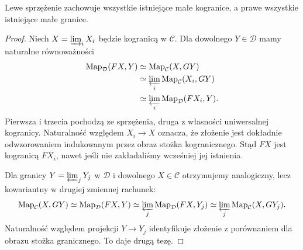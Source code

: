 \begin{stwierdzenie}\label{cat:prop:infty-adjoint-preservation}
Lewe sprzężenie zachowuje wszystkie istniejące małe kogranice, a prawe wszystkie istniejące małe granice.
\end{stwierdzenie}
\begin{proof}
Niech $X=\varinjlim_i X_i$ będzie kogranicą w $\mathcal C$. Dla dowolnego $Y\in\mathcal D$ mamy naturalne równoważności
\[
\begin{aligned}
 \operatorname{Map}_{\mathcal D}(FX,Y)
 &\simeq \operatorname{Map}_{\mathcal C}(X,GY)\\
 &\simeq \varprojlim_i\operatorname{Map}_{\mathcal C}(X_i,GY)\\
 &\simeq \varprojlim_i\operatorname{Map}_{\mathcal D}(FX_i,Y).
\end{aligned}
\]
Pierwsza i trzecia pochodzą ze sprzężenia, druga z własności uniwersalnej kogranicy. Naturalność względem $X_i\to X$ oznacza, że złożenie jest dokładnie odwzorowaniem indukowanym przez obraz stożka kogranicznego. Stąd $FX$ jest kogranicą $FX_i$, nawet jeśli nie zakładaliśmy wcześniej jej istnienia.

Dla granicy $Y=\varprojlim_jY_j$ w $\mathcal D$ i dowolnego $X\in\mathcal C$ otrzymujemy analogiczny, lecz kowariantny w drugiej zmiennej rachunek:
\[
 \operatorname{Map}_{\mathcal C}(X,GY)
 \simeq\operatorname{Map}_{\mathcal D}(FX,Y)
 \simeq\varprojlim_j\operatorname{Map}_{\mathcal D}(FX,Y_j)
 \simeq\varprojlim_j\operatorname{Map}_{\mathcal C}(X,GY_j).
\]
Naturalność względem projekcji $Y\to Y_j$ identyfikuje złożenie z porównaniem dla obrazu stożka granicznego. To daje drugą tezę.
\end{proof}

